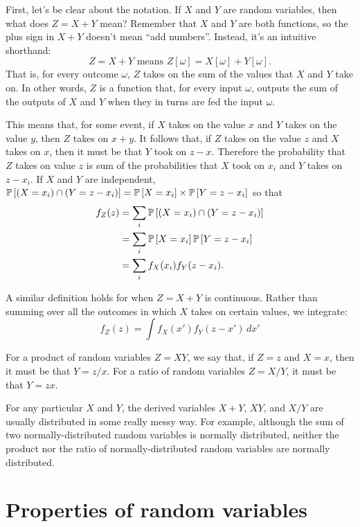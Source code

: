 First, let's be clear about the notation. If $X$ and $Y$ are random variables,
then what does $Z = X + Y$ mean? Remember that $X$ and $Y$ are both functions,
so the plus sign in $X + Y$ doesn't mean ``add numbers''. Instead, it's an intuitive shorthand:
\begin{equation}
Z = X + Y \text{ means } Z[\omega] = X[\omega] + Y[\omega].
\end{equation}
That is, for every outcome $\omega$, $Z$ takes on the sum of the values that
$X$ and $Y$ take on. In other words, $Z$ is a function that, for every input
$\omega$, outputs the sum of the outputs of $X$ and $Y$ when they in turns are
fed the input $\omega$.

This means that, for some event, if $X$ takes on the value $x$ and $Y$ takes
on the value $y$, then $Z$ takes on $x+y$. It follows that, if
$Z$ takes on the value $z$ and $X$ takes on $x$, then it must be that $Y$
took on $z - x$. Therefore the probability that $Z$ takes on value $z$ is
sum of the probabilities that $X$ took on $x_i$ and $Y$ takes on $z - x_i$.
If $X$ and $Y$ are independent,
$\mathbb{P}\left[{(X = x_i) \cap (Y = z - x_i)}\right] = \mathbb{P}\left[{X = x_i}\right] \times \mathbb{P}\left[{Y = z - x_i}\right]$
so that
\begin{align*}
f_Z(z) &= \sum_i \mathbb{P}\left[{(X=x_i) \cap (Y=z - x_i)}\right] \\
  &= \sum_i \mathbb{P}\left[{X=x_i}\right] \mathbb{P}\left[{Y=z-x_i}\right] \\
  &= \sum_i f_X(x_i) f_Y(z - x_i).
\end{align*}

A similar definition holds for when $Z = X + Y$ is continuous. Rather than
summing over all the outcomes in which $X$ takes on certain values, we integrate:
\begin{equation}
f_Z(z) = \int f_X(x') f_Y(z - x') \,dx'
\end{equation}

For a product of random variables $Z = XY$, we say that,
if $Z = z$ and $X = x$, then it must be that $Y = z/x$.
For a ratio of random variables $Z = X/Y$, it must be that $Y = zx$.

For any particular $X$ and $Y$, the derived variables $X + Y$, $XY$, and $X/Y$
are usually distributed in some really messy way. For example, although the
sum of two normally-distributed random variables is normally distributed,
neither the product nor the ratio of normally-distributed random variables are
normally distributed.

\section{Properties of random variables}

